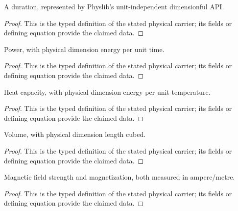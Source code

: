 \begin{definition}
  \label{def:physics:IPhO_2026_3_C_5:aux002}
  A duration, represented by Physlib's unit-independent dimensionful API.
\end{definition}
\begin{proof}
  This is the typed definition of the stated physical carrier; its fields or defining equation provide the claimed data.
\end{proof}

\begin{definition}
  \label{def:physics:IPhO_2026_3_C_5:aux003}
  Power, with physical dimension energy per unit time.
\end{definition}
\begin{proof}
  This is the typed definition of the stated physical carrier; its fields or defining equation provide the claimed data.
\end{proof}

\begin{definition}
  \label{def:physics:IPhO_2026_3_C_5:aux004}
  Heat capacity, with physical dimension energy per unit temperature.
\end{definition}
\begin{proof}
  This is the typed definition of the stated physical carrier; its fields or defining equation provide the claimed data.
\end{proof}

\begin{definition}
  \label{def:physics:IPhO_2026_3_C_5:aux005}
  Volume, with physical dimension length cubed.
\end{definition}
\begin{proof}
  This is the typed definition of the stated physical carrier; its fields or defining equation provide the claimed data.
\end{proof}

\begin{definition}
  \label{def:physics:IPhO_2026_3_C_5:aux006}
  Magnetic field strength and magnetization, both measured in ampere/metre.
\end{definition}
\begin{proof}
  This is the typed definition of the stated physical carrier; its fields or defining equation provide the claimed data.
\end{proof}

